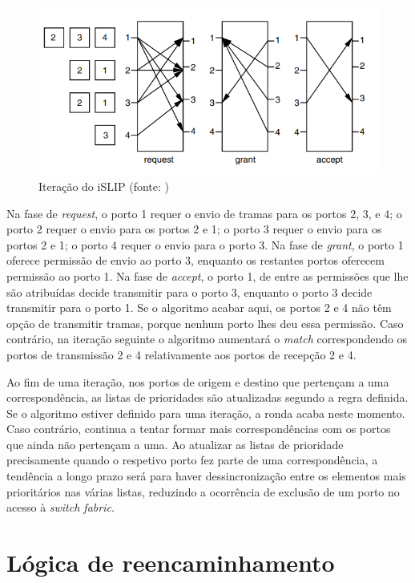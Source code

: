 \begin{figure}[!htb]
  \centering
  \includegraphics[width=1\textwidth]{imagem_islip.png}
  \caption[Iteração do iSLIP]{Iteração do iSLIP (fonte: \cite{math})}
  \label{fig:airbus1}
\end{figure}


Na fase de \textit{request}, o porto 1 requer o envio de tramas para os portos 2, 3, e 4; o porto 2 requer o envio para os portos 2 e 1; o porto 3 requer o envio para os portos 2 e 1; o porto 4 requer o envio para o porto 3. Na fase de \textit{grant}, o porto 1 oferece permissão de envio ao porto 3, enquanto os restantes portos oferecem permissão ao porto 1. Na fase de \textit{accept}, o porto 1, de entre as permissões que lhe são atribuídas decide transmitir para o porto 3, enquanto o porto 3 decide transmitir para o porto 1. Se o algoritmo acabar aqui, os portos 2 e 4 não têm opção de transmitir tramas, porque nenhum porto lhes deu essa permissão. Caso contrário, na iteração seguinte o algoritmo aumentará o \textit{match} correspondendo os portos de transmissão 2 e 4 relativamente aos portos de recepção 2 e 4.



Ao fim de uma iteração, nos portos de origem e destino que pertençam a uma correspondência, as listas de prioridades são atualizadas segundo a regra definida. Se o algoritmo estiver definido para uma iteração, a ronda acaba neste momento. Caso contrário, continua a tentar formar mais correspondências com os portos que ainda não pertençam a uma. Ao atualizar as listas de prioridade precisamente quando o respetivo porto fez parte de uma correspondência, a tendência a longo prazo será para haver dessincronização entre os elementos mais prioritários nas várias listas, reduzindo a ocorrência de exclusão de um porto no acesso à \textit{switch fabric}.


\section{Lógica de reencaminhamento}


